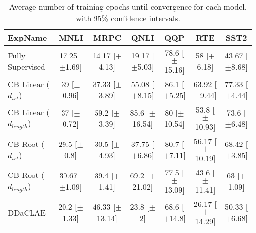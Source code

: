 \begin{table*}[ht]
\centering
\begingroup\small
\begin{tabular}{lcccccc}
  \hline
ExpName & MNLI & MRPC & QNLI & QQP & RTE & SST2 \\ 
  \hline
Fully Supervised & 17.25 [$\pm$1.69] & 14.17 [$\pm$4.13] & 19.17 [$\pm$5.03] & 78.6 [$\pm$15.16] & 58 [$\pm$6.18] & 43.67 [$\pm$8.68] \\ 
  CB Linear ($d_{irt}$) & 39 [$\pm$0.96] & 37.33 [$\pm$3.89] & 55.08 [$\pm$8.15] & 86.1 [$\pm$5.25] & 63.92 [$\pm$9.44] & 77.33 [$\pm$4.44] \\ 
  CB Linear ($d_{length}$) & 37 [$\pm$0.72] & 59.2 [$\pm$3.39] & 85.6 [$\pm$16.54] & 80 [$\pm$10.54] & 53.8 [$\pm$10.93] & 73.6 [$\pm$6.48] \\ 
  CB Root ($d_{irt}$) & 29.5 [$\pm$0.8] & 30.5 [$\pm$4.93] & 37.75 [$\pm$6.86] & 80.7 [$\pm$7.11] & 56.17 [$\pm$10.19] & 68.42 [$\pm$3.85] \\ 
  CB Root ($d_{length}$) & 30.67 [$\pm$1.09] & 39.4 [$\pm$1.41] & 69.2 [$\pm$21.02] & 77.5 [$\pm$13.09] & 43.6 [$\pm$11.41] & 63 [$\pm$1.09] \\ 
  DDaCLAE & 20.2 [$\pm$1.33] & 46.33 [$\pm$13.14] & 23.8 [$\pm$2] & 68.6 [$\pm$14.8] & 26.17 [$\pm$14.29] & 50.33 [$\pm$6.68] \\ 
   \hline
\end{tabular}
\endgroup
\caption{Average number of training epochs until convergence for each model, with 95\% confidence intervals.} 
\label{tab:epoch_lstm-True}
\end{table*}
